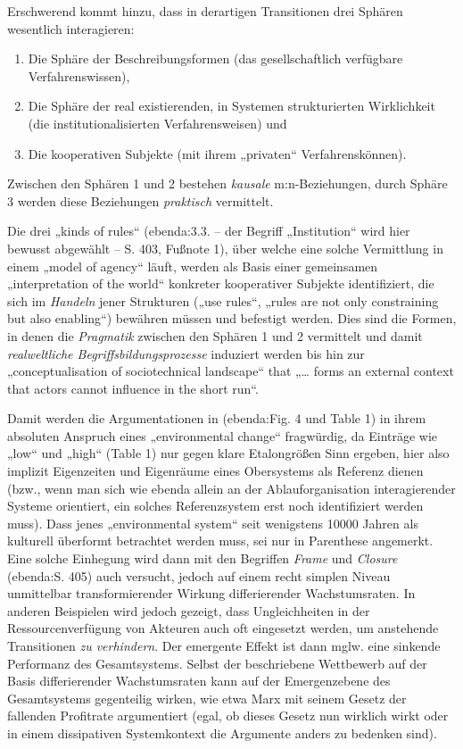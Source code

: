 \documentclass[11pt,a4paper]{article}
\begin{document}
Erschwerend kommt hinzu, dass in derartigen Transitionen drei Sphären
wesentlich interagieren:
\begin{enumerate}[noitemsep]
\item Die Sphäre der Beschreibungsformen (das gesellschaftlich verfügbare
  Verfahrenswissen),
\item Die Sphäre der real existierenden, in Systemen strukturierten
  Wirklichkeit (die institutionalisierten Verfahrensweisen) und
\item Die kooperativen Subjekte (mit ihrem „privaten“ Verfahrenskönnen).
\end{enumerate}
Zwischen den Sphären 1 und 2 bestehen \emph{kausale} m:n-Beziehungen, durch
Sphäre 3 werden diese Beziehungen \emph{praktisch} vermittelt.

Die drei „kinds of rules“ (ebenda:3.3. -- der Begriff „Institution“ wird hier
bewusst abgewählt -- S. 403, Fußnote 1), über welche eine solche Vermittlung
in einem „model of agency“ läuft, werden als Basis einer gemeinsamen
„interpretation of the world“ konkreter kooperativer Subjekte identifiziert,
die sich im \emph{Handeln} jener Strukturen („use rules“, „rules are not only
constraining but also enabling“) bewähren müssen und befestigt werden. Dies
sind die Formen, in denen die \emph{Pragmatik} zwischen den Sphären 1 und 2
vermittelt und damit \emph{realweltliche Begriffsbildungsprozesse} induziert
werden bis hin zur „conceptualisation of sociotechnical landscape“ that
„\ldots{} forms an external context that actors cannot influence in the short
run“.

Damit werden die Argumentationen in (ebenda:Fig. 4 und Table 1) in ihrem
absoluten Anspruch eines „environmental change“ fragwürdig, da Einträge wie
„low“ und „high“ (Table 1) nur gegen klare Etalongrößen Sinn ergeben, hier
also implizit Eigenzeiten und Eigenräume eines Obersystems als Referenz dienen
(bzw., wenn man sich wie ebenda allein an der Ablauforganisation
interagierender Systeme orientiert, ein solches Referenzsystem erst noch
identifiziert werden muss). Dass jenes „environmental system“ seit wenigstens
10000 Jahren als kulturell überformt betrachtet werden muss, sei nur in
Parenthese angemerkt. Eine solche Einhegung wird dann mit den Begriffen
\emph{Frame} und \emph{Closure} (ebenda:S. 405) auch versucht, jedoch auf
einem recht simplen Niveau unmittelbar transformierender Wirkung
differierender Wachstumsraten. In anderen Beispielen wird jedoch gezeigt, dass
Ungleichheiten in der Ressourcenverfügung von Akteuren auch oft eingesetzt
werden, um anstehende Transitionen \emph{zu verhindern}. Der emergente Effekt
ist dann mglw. eine sinkende Performanz des Gesamtsystems. Selbst der
beschriebene Wettbewerb auf der Basis differierender Wachstumsraten kann auf
der Emergenzebene des Gesamtsystems gegenteilig wirken, wie etwa Marx mit
seinem Gesetz der fallenden Profitrate argumentiert (egal, ob dieses Gesetz
nun wirklich wirkt oder in einem dissipativen Systemkontext die Argumente
anders zu bedenken sind).
\end{document}
